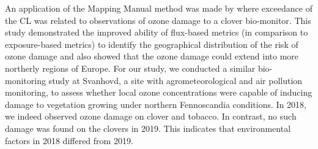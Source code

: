 \documentclass[bg, manuscript]{copernicus}
\begin{document}
An application of the Mapping Manual method was made by \citet{GCB:Mills2011} where exceedance of the CL was related to observations of ozone damage to a clover bio-monitor. This study demonstrated the improved ability of flux-based metrics (in comparison to exposure-based metrics) to identify the geographical distribution of the risk of ozone damage and also showed that the ozone damage could extend into more northerly regions of Europe. For our study, we conducted a similar bio-monitoring study at Svanhovd, a site with agrometeorological and air pollution monitoring, to assess whether local ozone concentrations were capable of inducing damage to vegetation growing under northern Fennoscandia conditions. In 2018, we indeed observed ozone damage on clover and tobacco. In contrast, no such damage was found on the clovers in 2019. This indicates that environmental factors in 2018 differed from 2019.
\end{document}
